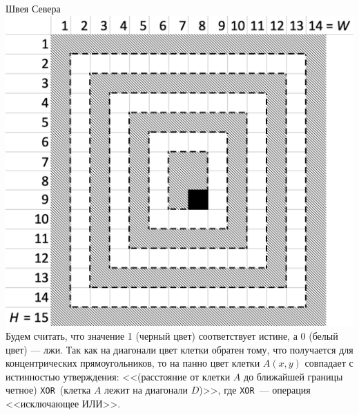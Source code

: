 \begin{tutorial}{Швея Севера}
{\includegraphics[bb=0 0 7.2in 7in, scale=.3]{loskut_tut_2.png}
}\\
Будем считать, что значение 1 (черный цвет) соответствует истине, а 0 (белый цвет) --- лжи. Так как на диагонали цвет клетки обратен тому, что получается для концентрических прямоугольников, то на панно цвет клетки $A(x,y)$ совпадает с истинностью утверждения:
<<(расстояние от клетки $A$ до ближайшей границы четное) \texttt{XOR}~(клетка $A$ лежит на диагонали $D$)>>, где \texttt{XOR}~--- операция <<исключающее ИЛИ>>.


\end{tutorial}
